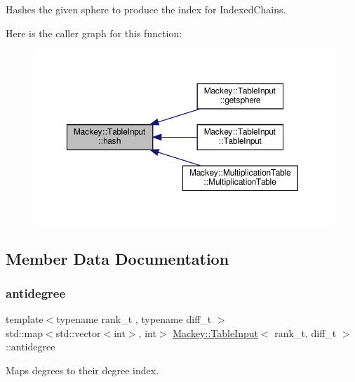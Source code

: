 Hashes the given sphere to produce the index for Indexed\+Chains. 

Here is the caller graph for this function\+:\nopagebreak
\begin{figure}[H]
\begin{center}
\leavevmode
\includegraphics[width=350pt]{classMackey_1_1TableInput_aff13b1ef901103816a6ed49bae688629_icgraph}
\end{center}
\end{figure}


\subsection{Member Data Documentation}
\mbox{\label{classMackey_1_1TableInput_a0eef9eba4856780865fba0abe32057e7}} 
\subsubsection{\texorpdfstring{antidegree}{antidegree}}
{\footnotesize\ttfamily template$<$typename rank\+\_\+t , typename diff\+\_\+t $>$ \\
std\+::map$<$std\+::vector$<$int$>$, int$>$ \hyperlink{classMackey_1_1TableInput}{Mackey\+::\+Table\+Input}$<$ rank\+\_\+t, diff\+\_\+t $>$\+::antidegree\hspace{0.3cm}{\ttfamily [protected]}}



Maps degrees to their degree index. 

\mbox{\label{classMackey_1_1TableInput_ad37f09ab6d0bfdab5d55537145b916ed}} 

